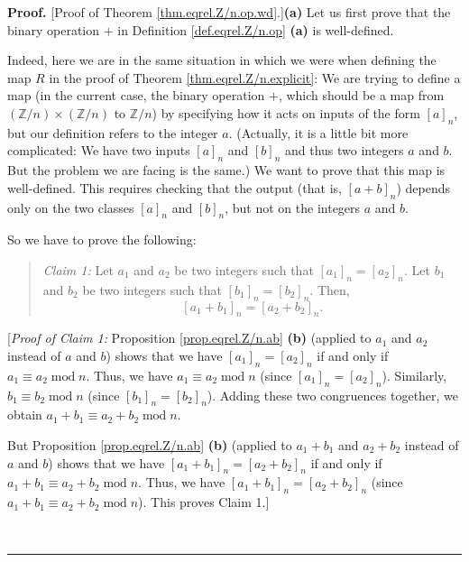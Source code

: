 \documentclass[numbers=enddot,12pt,final,onecolumn,notitlepage]{scrartcl}%
\numberwithin{exer}{subsection}
\theoremstyle{definition}
\newenvironment{statement}{\begin{quote}}{\end{quote}}
\newenvironment{proof}[1][Proof]{\noindent\textbf{#1.} }{\ \rule{0.5em}{0.5em}}
\begin{document}
\begin{proof}
[Proof of Theorem \ref{thm.eqrel.Z/n.op.wd}.]\textbf{(a)} Let us first prove
that the binary operation $+$ in Definition \ref{def.eqrel.Z/n.op}
\textbf{(a)} is well-defined.

Indeed, here we are in the same situation in which we were when defining the
map $R$ in the proof of Theorem \ref{thm.eqrel.Z/n.explicit}: We are trying to
define a map (in the current case, the binary operation $+$, which should be a
map from $\left(  \mathbb{Z}/n\right)  \times\left(  \mathbb{Z}/n\right)  $ to
$\mathbb{Z}/n$) by specifying how it acts on inputs of the form $\left[
a\right]  _{n}$, but our definition refers to the integer $a$. (Actually, it
is a little bit more complicated: We have two inputs $\left[  a\right]  _{n}$
and $\left[  b\right]  _{n}$ and thus two integers $a$ and $b$. But the
problem we are facing is the same.) We want to prove that this map is
well-defined. This requires checking that the output (that is, $\left[
a+b\right]  _{n}$) depends only on the two classes $\left[  a\right]  _{n}$
and $\left[  b\right]  _{n}$, but not on the integers $a$ and $b$.

So we have to prove the following:

\begin{statement}
\textit{Claim 1:} Let $a_{1}$ and $a_{2}$ be two integers such that $\left[
a_{1}\right]  _{n}=\left[  a_{2}\right]  _{n}$. Let $b_{1}$ and $b_{2}$ be two
integers such that $\left[  b_{1}\right]  _{n}=\left[  b_{2}\right]  _{n}$.
Then,%
\[
\left[  a_{1}+b_{1}\right]  _{n}=\left[  a_{2}+b_{2}\right]  _{n}.
\]

\end{statement}

[\textit{Proof of Claim 1:} Proposition \ref{prop.eqrel.Z/n.ab} \textbf{(b)}
(applied to $a_{1}$ and $a_{2}$ instead of $a$ and $b$) shows that we have
$\left[  a_{1}\right]  _{n}=\left[  a_{2}\right]  _{n}$ if and only if
$a_{1}\equiv a_{2}\operatorname{mod}n$. Thus, we have $a_{1}\equiv
a_{2}\operatorname{mod}n$ (since $\left[  a_{1}\right]  _{n}=\left[
a_{2}\right]  _{n}$). Similarly, $b_{1}\equiv b_{2}\operatorname{mod}n$ (since
$\left[  b_{1}\right]  _{n}=\left[  b_{2}\right]  _{n}$). Adding these two
congruences together, we obtain $a_{1}+b_{1}\equiv a_{2}+b_{2}%
\operatorname{mod}n$.

But Proposition \ref{prop.eqrel.Z/n.ab} \textbf{(b)} (applied to $a_{1}+b_{1}$
and $a_{2}+b_{2}$ instead of $a$ and $b$) shows that we have $\left[
a_{1}+b_{1}\right]  _{n}=\left[  a_{2}+b_{2}\right]  _{n}$ if and only if
$a_{1}+b_{1}\equiv a_{2}+b_{2}\operatorname{mod}n$. Thus, we have $\left[
a_{1}+b_{1}\right]  _{n}=\left[  a_{2}+b_{2}\right]  _{n}$ (since $a_{1}%
+b_{1}\equiv a_{2}+b_{2}\operatorname{mod}n$). This proves Claim 1.]


\end{proof}
\end{document}
